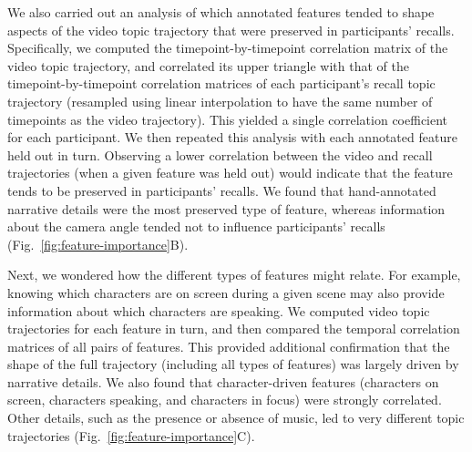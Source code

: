 \documentclass{article}
\begin{document}
We also carried out an analysis of which annotated features tended to shape aspects of the video topic trajectory that were preserved in participants' recalls.  Specifically, we computed the timepoint-by-timepoint correlation matrix of the video topic trajectory, and correlated its upper triangle with that of the timepoint-by-timepoint correlation matrices of each participant's recall topic trajectory (resampled using linear interpolation to have the same number of timepoints as the video trajectory).  This yielded a single correlation coefficient for each participant.  We then repeated this analysis with each annotated feature held out in turn.  Observing a lower correlation between the video and recall trajectories (when a given feature was held out) would indicate that the feature tends to be preserved in participants' recalls.  We found that hand-annotated narrative details were the most preserved type of feature, whereas information about the camera angle tended not to influence participants' recalls (Fig.~\ref{fig:feature-importance}B).

Next, we wondered how the different types of features might relate.  For example, knowing which characters are on screen during a given scene may also provide information about which characters are speaking.  We computed video topic trajectories for each feature in turn, and then compared the temporal correlation matrices of all pairs of features.  This provided additional confirmation that the shape of the full trajectory (including all types of features) was largely driven by narrative details.  We also found that character-driven features (characters on screen, characters speaking, and characters in focus) were strongly correlated.  Other details, such as the presence or absence of music, led to very different topic trajectories (Fig.~\ref{fig:feature-importance}C).



\end{document}
